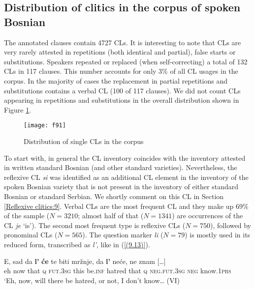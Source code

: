 \subsection{Distribution of clitics in the corpus of spoken Bosnian}
\label{Distribution of clitics in the corpus of spoken Bosnian}

The annotated clauses contain 4727 CLs. It is interesting to note that CLs are very rarely attested in repetitions (both identical and partial), false starts or substitutions. Speakers repeated or replaced (when self-correcting) a total of 132 CLs in 117 clauses. This number accounts for only 3\% of all CL usages in the corpus. In the majority of cases the replacement in partial repetitions and substitutions contains a verbal CL (100 of 117 clauses). We did not count CLs appearing in repetitions and substitutions in the overall distribution shown in Figure \ref{F.9.1}.

\begin{figure}
\caption{Distribution of single CLs in the corpus}
\label{F.9.1}
\texttt{[image: f91]}
\end{figure}

To start with, in general the CL inventory coincides with the inventory attested in written standard Bosnian (and other standard varieties). Nevertheless, the reflexive CL \textit{si} was identified as an additional CL element in the inventory of the spoken Bosnian variety that is not present in the inventory of either standard Bosnian or standard Serbian. We shortly comment on this CL in Section \ref{Reflexive clitics:9}. Verbal CLs are the most frequent CL and they make up 69\% of the sample ($N=3210$; almost half of that ($N=1341$) are occurrences of the CL \textit{je} ‘is’). The second most frequent type is reflexive CLs ($N=750$), followed by pronominal CLs ($N=565$). The question marker \textit{li} ($N=79$) is mostly used in its reduced form, transcribed as \textit{l’}, like in (\ref{(9.13)}). 

\begin{exe}\ex\label{(9.13)}
\gll E, sad da \textbf{l’}           \textbf{će } te biti mržnje, da \textbf{l’ } neće, ne {znam  [\dots]}  \\
          eh now that \textsc{q} \textsc{fut}.3\textsc{sg} this be.\textsc{inf} hatred that \textsc{q} \textsc{neg}.\textsc{fut}.3\textsc{sg} \textsc{neg} know.1\textsc{prs} \\
\glt ‘Eh, now, will there be hatred, or not, I don’t know…
\hfill (VI)
\end{exe}

